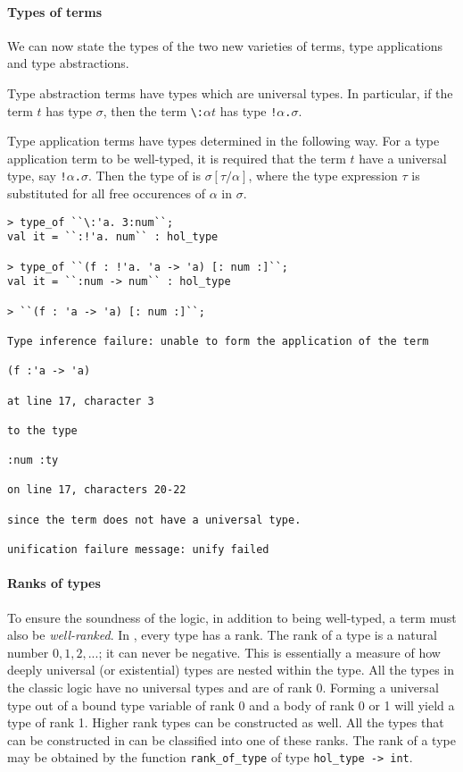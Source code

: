 \paragraph{Types of terms}
We can now state the types of the two new varieties of terms,
type applications and type abstractions.

Type abstraction terms have types which are universal types.
In particular, if the term $t$ has type $\sigma$, then the term
{\small\verb|\:|}$\alpha$$t$\ml{} has type
\texttt{!$\alpha$.$\sigma$}.

Type application terms have types determined in the following way.  For a
type application term  to be well-typed, it is required
that the term $t$ have a universal type, say \texttt{!$\alpha$.$\sigma$}.
Then the type of  is $\sigma[\tau / \alpha]$,
where the type expression $\tau$ is substituted for all free occurences
of $\alpha$ in $\sigma$.
%
\begin{session}
\begin{verbatim}
> type_of ``\:'a. 3:num``;
val it = ``:!'a. num`` : hol_type

> type_of ``(f : !'a. 'a -> 'a) [: num :]``; 
val it = ``:num -> num`` : hol_type

> ``(f : 'a -> 'a) [: num :]``;

Type inference failure: unable to form the application of the term

(f :'a -> 'a)

at line 17, character 3

to the type

:num :ty

on line 17, characters 20-22

since the term does not have a universal type.

unification failure message: unify failed
\end{verbatim}
\end{session}

\paragraph{Ranks of types}
To ensure the soundness of the \HOLW{} logic,
in addition to being well-typed, a term must also be {\it well-ranked}.
In \HOLW, every type has a rank.
The rank of a type is a natural number $0, 1, 2, ...$; it can never be negative.
This is essentially a measure of how deeply universal (or existential) types 
are nested within the type.
All the types in the classic \HOL{} logic have no universal types and
are of rank 0.  Forming a universal type out of a bound type variable
of rank 0 and a body of rank 0 or 1 will yield a type of rank 1.
Higher rank types can be constructed as well.
All the types that can be constructed in \HOLW{} can be
classified into one of these ranks.
%
The rank of a type may be obtained by the \ML{} function
\texttt{rank\_of\_type} of type \texttt{hol\_type -> int}.

